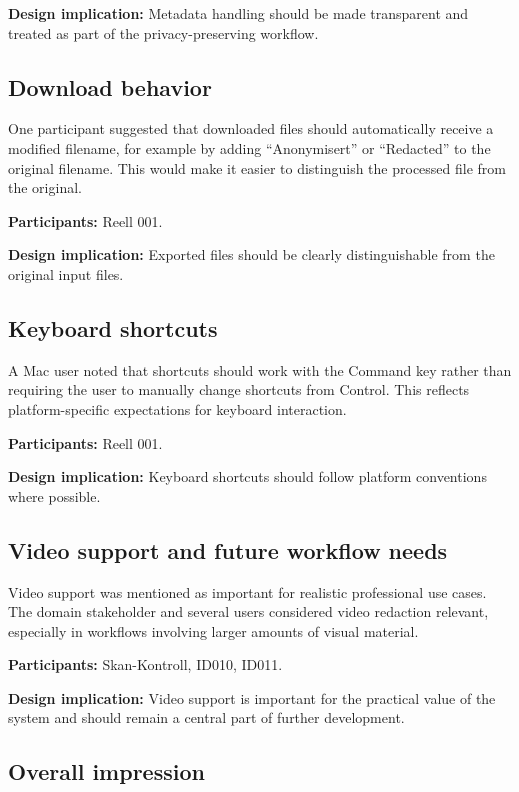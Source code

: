 \textbf{Design implication:} Metadata handling should be made transparent and
treated as part of the privacy-preserving workflow.

\subsection*{Download behavior}

One participant suggested that downloaded files should automatically receive a
modified filename, for example by adding ``Anonymisert'' or ``Redacted'' to the
original filename. This would make it easier to distinguish the processed file
from the original.

\textbf{Participants:} Reell 001.

\textbf{Design implication:} Exported files should be clearly distinguishable
from the original input files.

\subsection*{Keyboard shortcuts}

A Mac user noted that shortcuts should work with the Command key rather than
requiring the user to manually change shortcuts from Control. This reflects
platform-specific expectations for keyboard interaction.

\textbf{Participants:} Reell 001.

\textbf{Design implication:} Keyboard shortcuts should follow platform
conventions where possible.

\subsection*{Video support and future workflow needs}

Video support was mentioned as important for realistic professional use cases.
The domain stakeholder and several users considered video redaction relevant,
especially in workflows involving larger amounts of visual material.

\textbf{Participants:} Skan-Kontroll, ID010, ID011.

\textbf{Design implication:} Video support is important for the practical value
of the system and should remain a central part of further development.

\subsection*{Overall impression}

